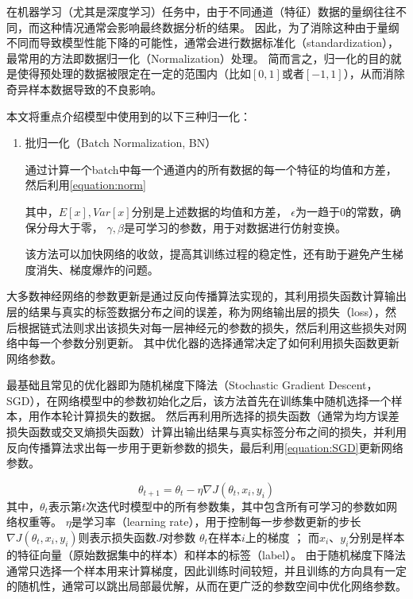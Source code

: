 在机器学习（尤其是深度学习）任务中，由于不同通道（特征）数据的量纲往往不同，而这种情况通常会影响最终数据分析的结果。
因此，为了消除这种由于量纲不同而导致模型性能下降的可能性，通常会进行数据标准化（standardization），最常用的方法即数据归一化（Normalization）处理。
简而言之，归一化的目的就是使得预处理的数据被限定在一定的范围内（比如$[0,1]$或者$[-1,1]$），从而消除奇异样本数据导致的不良影响。

本文将重点介绍模型中使用到的以下三种归一化：
\begin{enumerate}
  \item 批归一化（Batch Normalization, BN）

  
  通过计算一个batch中每一个通道内的所有数据的每一个特征的均值和方差，然后利用\cref{equation:norm}


其中，$E\left[ x\right], Var\left[ x\right]$分别是上述数据的均值和方差， $\epsilon$为一趋于0的常数，确保分母大于零，
$\gamma, \beta$是可学习的参数，用于对数据进行仿射变换。

该方法可以加快网络的收敛，提高其训练过程的稳定性，还有助于避免产生梯度消失、梯度爆炸的问题。


  
  

\end{enumerate}


大多数神经网络的参数更新是通过反向传播算法实现的，其利用损失函数计算输出层的结果与真实的标签数据分布之间的误差，称为网络输出层的损失（loss），然后根据链式法则求出该损失对每一层神经元的参数的损失，然后利用这些损失对网络中每一个参数分别更新。
其中优化器的选择通常决定了如何利用损失函数更新网络参数。

最基础且常见的优化器即为随机梯度下降法（Stochastic Gradient Descent，SGD），在网络模型中的参数初始化之后，该方法首先在训练集中随机选择一个样本，用作本轮计算损失的数据。
然后再利用所选择的损失函数（通常为均方误差损失函数或交叉熵损失函数）计算出输出结果与真实标签分布之间的损失，并利用反向传播算法求出每一步用于更新参数的损失，最后利用\cref{equation:SGD}更新网络参数。

\begin{equation}
  \label{equation:SGD}
  \theta_{t+1} = \theta_{t} - \eta \nabla J(\theta_{t}, x_i, y_i)
\end{equation}
其中，$\theta_{t}$表示第$t$次迭代时模型中的所有参数集，其中包含所有可学习的参数如网络权重等。
$\eta$是学习率（learning rate），用于控制每一步参数更新的步长
$\nabla J(\theta_{t}, x_i, y_i)$则表示损失函数$J$对参数 $\theta_{t}$在样本$i$上的梯度 ；
而$x_i$、$y_i$分别是样本的特征向量（原始数据集中的样本）和样本的标签（label）。
由于随机梯度下降法通常只选择一个样本用来计算梯度，因此训练时间较短，并且训练的方向具有一定的随机性，通常可以跳出局部最优解，从而在更广泛的参数空间中优化网络参数。

